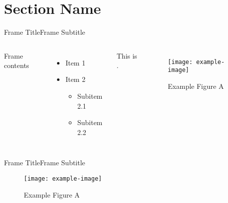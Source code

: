 \section{Section Name}
\graphicspath{{figs/section2/}} %

\begin{frame}{Frame Title}{Frame Subtitle}
    \begin{columns}
        Frame contents
            \begin{itemize}
                \item Item 1
                \item Item 2
                \begin{itemize}
                    \item Subitem 2.1
                    \item Subitem 2.2
                \end{itemize}
            \end{itemize}
            This is .
        \begin{figure}
            \begin{center}
                \texttt{[image: example-image]}
                \caption{Example Figure A}
            \end{center}
        \end{figure}
    \end{columns}
\end{frame}

\begin{frame}{Frame Title}{Frame Subtitle}
    \begin{figure}
        \begin{center}
            \texttt{[image: example-image]}
            \caption{Example Figure A}
        \end{center}
    \end{figure}
\end{frame}

